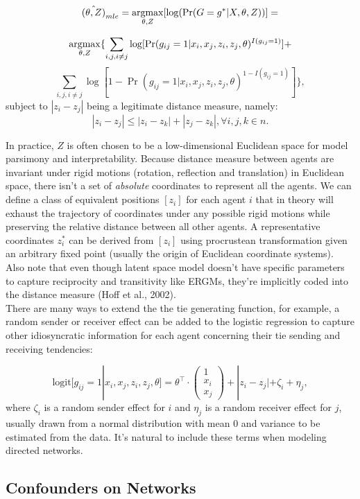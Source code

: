 \documentclass[11pt]{article}
\newcommand{\argmax}{\operatornamewithlimits{argmax}}
\begin{document}
$${\hat{(\theta,Z)}}_{mle} = \argmax_{\theta,Z} [\log(\Pr(G=g^*|X,\theta,Z))]=$$

$$\argmax_{\theta,Z}\{
\sum_{i,j,i\not=j} \log [\Pr(g_{ij}=1|x_i,x_j,z_i,z_j,\theta)^{I(g_{ij}=1)}] + $$
$$\sum_{i,j,i\not=j} \log [1-\Pr(g_{ij}=1|x_i,x_j,z_i,z_j,\theta)^{1-I(g_{ij}=1)}]\},$$
subject to $|z_i -z_j|$ being a legitimate distance measure, namely:
$$|z_i - z_j|\le |z_i - z_k|+|z_j-z_k|, \forall i,j,k \in n. $$

In practice, $Z$ is often chosen to be a low-dimensional Euclidean space for model parsimony and interpretability. Because distance measure between agents are invariant under rigid motions (rotation, reflection and translation) in Euclidean space, there isn't a set of \emph{absolute} coordinates to represent all the agents. We can define a class of equivalent positions $[z_{i}]$ for each agent $i$ that in theory will exhaust the trajectory of coordinates under any possible rigid motions while preserving the relative distance between all other agents. A representative coordinates $z_i^*$ can be derived from $[z_i]$ using procrustean transformation given an arbitrary fixed point (usually the origin of Euclidean coordinate systems). Also note that even though latent space model doesn't have specific parameters to capture reciprocity and transitivity like ERGMs, they're implicitly coded into the distance measure (Hoff et al., 2002).\\

There are many ways to extend the the tie generating function, for example, a random sender or receiver effect can be added to the logistic regression to capture other idiosyncratic information for each agent concerning their tie sending and receiving tendencies: 

$$\text{logit}[g_{ij}=1|x_i,x_j,z_i,z_j,\theta]=\theta^\intercal \cdot \begin{pmatrix}
1\\x_i\\x_j \end{pmatrix} + |z_i - z_j| + \zeta_i + \eta_j,$$
where $\zeta_i$ is a random sender effect for $i$ and $\eta_j$ is a random receiver effect for $j$, usually drawn from a normal distribution with mean $0$ and variance to be estimated from the data. It's natural to include these terms when modeling directed networks.

\subsection{Confounders on Networks}
\end{document}
